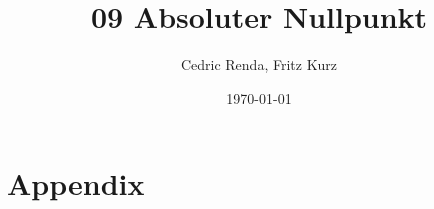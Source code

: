 \documentclass[12pt,a4paper]{article}
\title{09 Absoluter Nullpunkt}
\author{Cedric Renda, Fritz Kurz}
\date{\today }
\begin{document}
\maketitle

\tableofcontents







%
\newpage
%

\section{Appendix}

\end{document}
